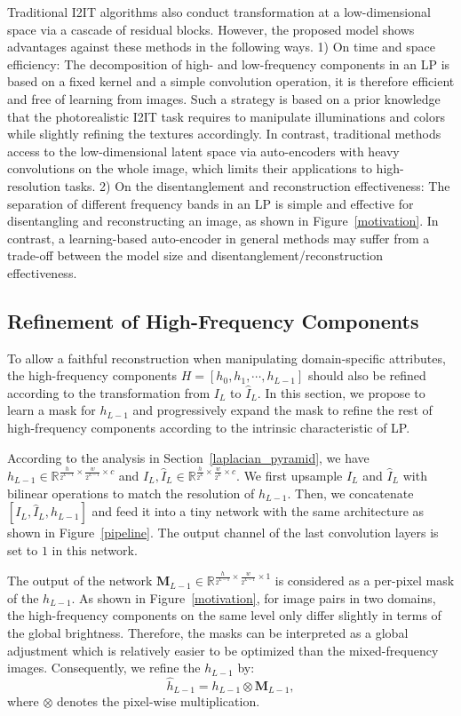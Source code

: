 \documentclass[10pt,twocolumn,letterpaper]{article}
\begin{document}
	Traditional I2IT algorithms also conduct transformation at a low-dimensional space via a cascade of residual blocks. However, the proposed model shows advantages against these methods in the following ways. 1) On time and space efficiency: The decomposition of high- and low-frequency components in an LP is based on a fixed kernel and a simple convolution operation, it is therefore efficient and free of learning from images. Such a strategy is based on a prior knowledge that the photorealistic I2IT task requires to manipulate illuminations and colors while slightly refining the textures accordingly. In contrast, traditional methods access to the low-dimensional latent space via auto-encoders with heavy convolutions on the whole image, which limits their applications to high-resolution tasks. 2) On the disentanglement and reconstruction effectiveness: The separation of different frequency bands in an LP is simple and effective for disentangling and reconstructing an image, as shown in Figure~\ref{motivation}. In contrast, a learning-based auto-encoder in general methods may suffer from a trade-off between the model size and disentanglement/reconstruction effectiveness.
		
	\subsection{Refinement of High-Frequency Components}
	
	To allow a faithful reconstruction when manipulating domain-specific attributes, the high-frequency components $H = [h_0, h_1, \cdots, h_{L-1}]$ should also be refined according to the transformation from $I_L$ to $\hat{I}_L$. In this section, we propose to learn a mask for $ h_{L-1} $ and progressively expand the mask to refine the rest of high-frequency components according to the intrinsic characteristic of LP.
	
	According to the analysis in Section~\ref{laplacian_pyramid}, we have $ h_{L-1} \in \mathbb{R}^{\frac{h}{2^{L-1}}\times \frac{w}{2^{L-1}}\times c} $ and $I_L, \hat{I}_L\in \mathbb{R}^{\frac{h}{2^{L}}\times \frac{w}{2^{L}}\times c}$. We first upsample $I_L$ and $\hat{I}_L$ with bilinear operations to match the resolution of $ h_{L-1} $. Then, we concatenate $[I_L, \hat{I}_L, h_{L-1}]$ and feed it into a tiny network with the same architecture as shown in Figure~\ref{pipeline}. The output channel of the last convolution layers is set to $1$ in this network.
	
	The output of the network $\bm{M}_{L-1}\in\mathbb{R}^{\frac{h}{2^{L-1}}\times \frac{w}{2^{L-1}}\times 1}$ is considered as a per-pixel mask of the $ h_{L-1} $. As shown in Figure~\ref{motivation}, for image pairs in two domains, the high-frequency components on the same level only differ slightly in terms of the global brightness. Therefore, the masks can be interpreted as a global adjustment which is relatively easier to be optimized than the mixed-frequency images. Consequently, we refine the $ h_{L-1} $ by:
	\begin{equation}
	\label{refine}
	\hat{h}_{L-1} =  h_{L-1} \otimes \bm{M}_{L-1},
	\end{equation}
	where $\otimes$ denotes the pixel-wise multiplication.
	
\end{document}
